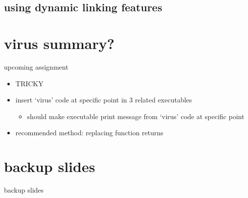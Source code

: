 

\subsection{using dynamic linking features}



\section{virus summary?}



\begin{frame}{upcoming assignment}
    \begin{itemize}
    \item TRICKY
    \item insert `virus' code at specific point in 3 related executables
        \begin{itemize}
        \item should make executable print message from `virus' code at specific point
        \end{itemize}
    \item recommended method: replacing function returns
    \end{itemize}
\end{frame}



\section{backup slides}
\begin{frame}{backup slides}
\end{frame}


